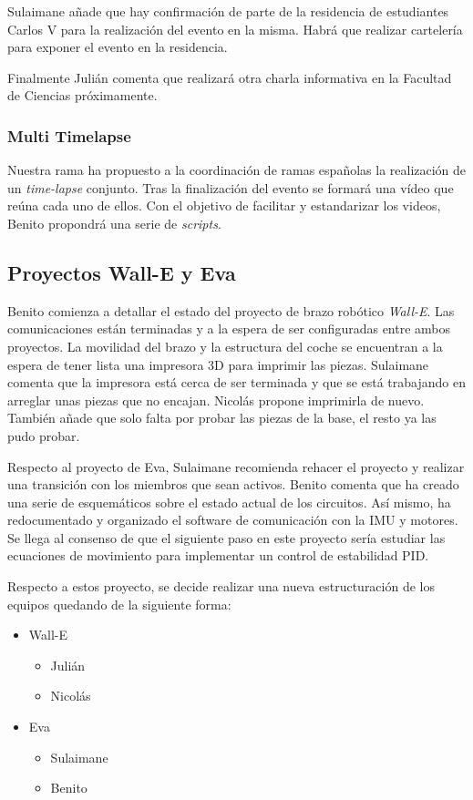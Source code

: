 \documentclass[12pt,twoside,openany,a4paper]{book}
\begin{document}
    Sulaimane añade que hay confirmación de parte de la residencia de estudiantes Carlos V para la realización del evento en la misma. Habrá que realizar cartelería para exponer el evento en la residencia.

    Finalmente Julián comenta que realizará otra charla informativa en la Facultad de Ciencias próximamente.

    \subsubsection{Multi Timelapse}
    Nuestra rama ha propuesto a la coordinación de ramas españolas la realización de un \textit{time-lapse} conjunto. Tras la finalización del evento se formará una vídeo que reúna cada uno de ellos. Con el objetivo de facilitar y estandarizar los videos, Benito propondrá una serie de \textit{scripts}.

    \subsection{Proyectos Wall-E y Eva}
    Benito comienza a detallar el estado del proyecto de brazo robótico \textit{Wall-E}. Las comunicaciones están terminadas y a la espera de ser configuradas entre ambos proyectos. La movilidad del brazo y la estructura del coche se encuentran a la espera de tener lista una impresora 3D para imprimir las piezas. Sulaimane comenta que la impresora está cerca de ser terminada y que se está trabajando en arreglar unas piezas que no encajan. Nicolás propone imprimirla de nuevo. También añade que solo falta por probar las piezas de la base, el resto ya las pudo probar.

    Respecto al proyecto de Eva, Sulaimane recomienda rehacer el proyecto y realizar una transición con los miembros que sean activos. Benito comenta que ha creado una serie de esquemáticos sobre el estado actual de los circuitos. Así mismo, ha redocumentado y organizado el software de comunicación con la IMU y motores. Se llega al consenso de que el siguiente paso en este proyecto sería estudiar las ecuaciones de movimiento para implementar un control de estabilidad PID.

    Respecto a estos proyecto, se decide realizar una nueva estructuración de los equipos quedando de la siguiente forma:
    \begin{itemize}
        \item Wall-E
        \begin{itemize}
            \item Julián
            \item Nicolás
        \end{itemize}
        \item Eva
        \begin{itemize}
            \item Sulaimane
            \item Benito
        \end{itemize}
    \end{itemize}
\end{document}
